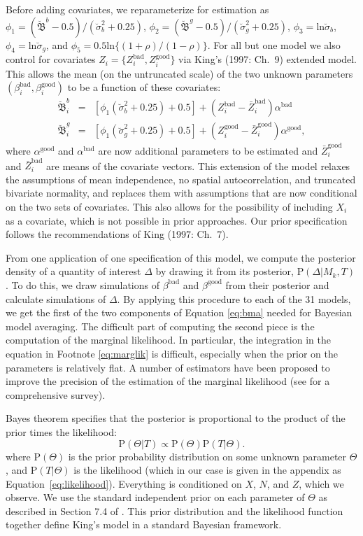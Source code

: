 \documentclass[11pt,titlepage]{article}
\newcommand{\bbetau}{\breve{\mathfrak B}}
\newcommand{\sigmau}{\breve{\sigma}}
\renewcommand{\P}{\text{P}}
\newcommand{\bb}{\beta^{\text{bad}}}
\newcommand{\bg}{\beta^{\text{good}}}
\begin{document}
Before adding covariates, we reparameterize for estimation as
$\phi_1=(\bbetau^b-0.5)/(\sigmau_b^2+0.25)$,
$\phi_2=(\bbetau^g-0.5)/(\sigmau_g^2+0.25)$,
$\phi_3=\text{ln}\sigmau_b$, $\phi_4=\text{ln}\sigmau_g$, and
$\phi_5=0.5\text{ln}\{(1+\rho)/(1-\rho)\}$.  For all but one model we
also control for covariates
$Z_i=\{Z_i^{\text{bad}},Z_i^{\text{good}}\}$ via King's (1997: Ch.\ 9)
extended model.  This allows the mean (on the untruncated scale) of
the two unknown parameters $(\bb_i, \bg_i)$ to be a function of these
covariates:
\begin{eqnarray}
\bbetau_i^b & = & [\phi_1 (\sigmau^2_b + 0.25) + 0.5] + (Z_i^{\text{bad}} -
\bar{Z}_i^{\text{bad}}) \alpha^{\text{bad}} \\
\bbetau_i^g & = & [\phi_1 (\sigmau^2_g + 0.25) + 0.5] + (Z_i^{\text{good}} -
\bar{Z}_i^{\text{good}}) \alpha^{\text{good}},
\end{eqnarray}
where $\alpha^{\text{good}}$ and $\alpha^{\text{bad}}$ are now
additional parameters to be estimated and $\bar{Z}_i^{\text{good}}$
and $\bar{Z}_i^{\text{bad}}$ are means of the covariate vectors.  This
extension of the model relaxes the assumptions of mean independence,
no spatial autocorrelation, and truncated bivariate normality, and
replaces them with assumptions that are now conditional on the two
sets of covariates.  This also allows for the possibility of including
$X_i$ as a covariate, which is not possible in prior approaches.  Our
prior specification follows the recommendations of King (1997: Ch.\ 
7)\nocite{king:97}.

From one application of one specification of this model, we compute
the posterior density of a quantity of interest $\Delta$ by drawing it
from its posterior, $\P(\Delta|M_k,T)$.  To do this, we draw
simulations of $\bb$ and $\bg$ from their posterior and calculate
simulations of $\Delta$.  By applying this procedure to each of the 31
models, we get the first of the two components of Equation
\ref{eq:bma} needed for Bayesian model averaging.  The difficult part
of computing the second piece is the computation of the marginal
likelihood.  In particular, the integration in the equation in
Footnote \ref{eq:marglik} is difficult, especially when the prior on
the parameters is relatively flat. A number of estimators have been
proposed to improve the precision of the estimation of the marginal
likelihood (see \citet{kass:raft:95} for a comprehensive survey).

Bayes theorem specifies that the posterior is proportional to the
product of the prior times the likelihood:
\begin{equation}
  \P(\Theta|T) \propto \P(\Theta)\P(T|\Theta).\label{eq:post}
\end{equation}
where $\P(\Theta)$ is the prior probability distribution on some
unknown parameter $\Theta$, and $\P(T|\Theta)$ is the likelihood
(which in our case is given in the appendix as
Equation~\ref{eq:likelihood}).  Everything is conditioned on $X$, $N$,
and $Z$, which we observe. We use the standard independent prior on
each parameter of $\Theta$ as described in Section 7.4 of
\citet{king:97}.  This prior distribution and the likelihood function
together define King's model in a standard Bayesian framework.
\end{document}
